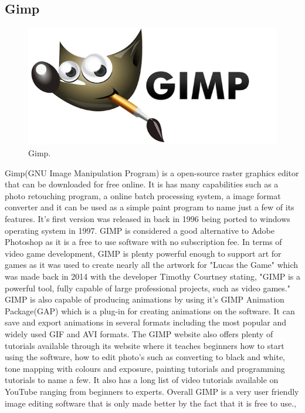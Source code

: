 \subsection{Gimp}
\begin{figure}[h]
  \includegraphics[width=\linewidth]{Images/gimp-logo.png}
  \caption{Gimp.}
  \label{fig:Gimp}
\end{figure}
Gimp(GNU Image Manipulation Program) is a open-source raster graphics editor that can be downloaded for free online. It is has many capabilities such as a photo retouching program, a online batch processing system, a image format converter and it can be used as a simple paint program to name just a few of its features. It's first version was released in back in 1996 being ported to windows operating system in 1997. GIMP is considered a good alternative to Adobe Photoshop as it is a free to use software with no subscription fee. In terms of video game development, GIMP is plenty powerful enough to support art for games as it was used to create nearly all the artwork for "Lucas the Game" which was made back in 2014 with the developer Timothy Courtney stating, "GIMP is a powerful tool, fully capable of large professional projects, such as video games."
GIMP is also capable of producing animations by using it's GIMP Animation Package(GAP) which is a plug-in for creating animations on the software. It can save and export animations in several formats including the most popular and widely used GIF and AVI formats. The GIMP website also offers plenty of tutorials available through its website where it teaches beginners how to start using the software, how to edit photo's such as converting to black and white, tone mapping with colours and exposure, painting tutorials and programming tutorials to name a few. It also has a long list of video tutorials available on YouTube ranging from beginners to experts.
Overall GIMP is a very user friendly image editing software that is only made better by the fact that it is free to use.\cite{GIMP},\cite{GIMPTutorial}
\newpage

